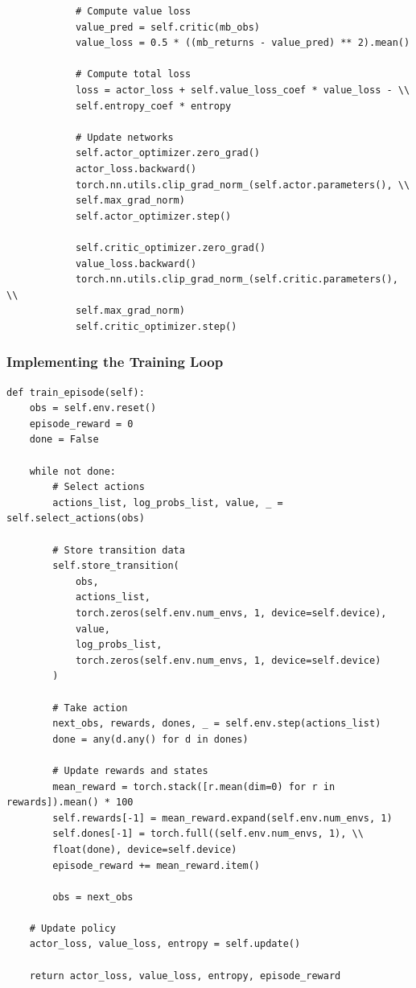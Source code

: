 \documentclass[12pt]{article}
\begin{document}
\begin{verbatim}
            # Compute value loss
            value_pred = self.critic(mb_obs)
            value_loss = 0.5 * ((mb_returns - value_pred) ** 2).mean()
            
            # Compute total loss
            loss = actor_loss + self.value_loss_coef * value_loss - \\
            self.entropy_coef * entropy
            
            # Update networks
            self.actor_optimizer.zero_grad()
            actor_loss.backward()
            torch.nn.utils.clip_grad_norm_(self.actor.parameters(), \\
            self.max_grad_norm)
            self.actor_optimizer.step()
            
            self.critic_optimizer.zero_grad()
            value_loss.backward()
            torch.nn.utils.clip_grad_norm_(self.critic.parameters(), \\
            self.max_grad_norm)
            self.critic_optimizer.step()
\end{verbatim}

\subsubsection{Implementing the Training Loop}

\begin{verbatim}
def train_episode(self):
    obs = self.env.reset()
    episode_reward = 0
    done = False
    
    while not done:
        # Select actions
        actions_list, log_probs_list, value, _ = self.select_actions(obs)
        
        # Store transition data
        self.store_transition(
            obs,
            actions_list,
            torch.zeros(self.env.num_envs, 1, device=self.device),
            value,
            log_probs_list,
            torch.zeros(self.env.num_envs, 1, device=self.device)
        )
        
        # Take action
        next_obs, rewards, dones, _ = self.env.step(actions_list)
        done = any(d.any() for d in dones)
        
        # Update rewards and states
        mean_reward = torch.stack([r.mean(dim=0) for r in rewards]).mean() * 100
        self.rewards[-1] = mean_reward.expand(self.env.num_envs, 1)
        self.dones[-1] = torch.full((self.env.num_envs, 1), \\
        float(done), device=self.device)
        episode_reward += mean_reward.item()
        
        obs = next_obs
    
    # Update policy
    actor_loss, value_loss, entropy = self.update()
    
    return actor_loss, value_loss, entropy, episode_reward
\end{verbatim}
\end{document}
